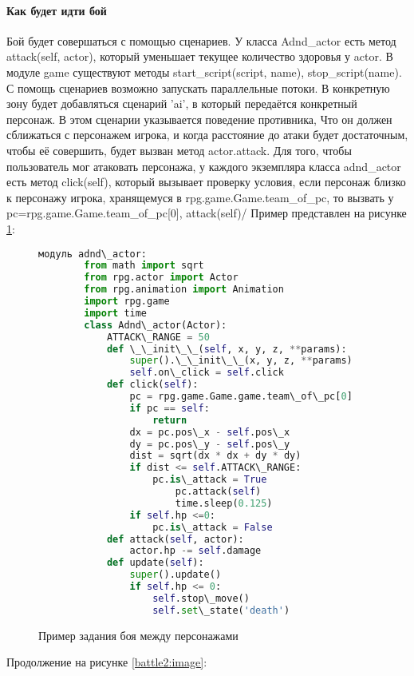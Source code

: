 \paragraph{Как будет идти бой}
Бой будет совершаться с помощью сценариев. У класса Adnd\_actor есть метод attack(self, actor), который уменьшает текущее количество здоровья у actor. В модуле game существуют методы start\_script(script, name), stop\_script(name). С помощь сценариев возможно запускать параллельные потоки. В конкретную зону будет добавляться сценарий 'ai', в который передаётся конкретный персонаж. В этом сценарии указывается поведение противника, Что он должен сближаться с персонажем игрока, и когда расстояние до атаки будет достаточным, чтобы её совершить, будет вызван метод actor.attack. Для того, чтобы пользователь мог атаковать персонажа, у каждого экземпляра класса adnd\_actor есть метод click(self), который вызывает проверку условия, если персонаж близко к персонажу игрока, хранящемуся в rpg.game.Game.team\_of\_pc, то вызвать у pc=rpg.game.Game.team\_of\_pc[0], attack(self)/
Пример представлен на рисунке \ref{battle:image}:
\begin{figure}[H]
	\begin{lstlisting}[language=Python]
		модуль adnd\_actor:
		from math import sqrt
		from rpg.actor import Actor
		from rpg.animation import Animation
		import rpg.game
		import time
		class Adnd\_actor(Actor):	
			ATTACK\_RANGE = 50
			def \_\_init\_\_(self, x, y, z, **params):
				super().\_\_init\_\_(x, y, z, **params)
				self.on\_click = self.click
			def click(self):
				pc = rpg.game.Game.game.team\_of\_pc[0]
				if pc == self:
					return
				dx = pc.pos\_x - self.pos\_x
				dy = pc.pos\_y - self.pos\_y
				dist = sqrt(dx * dx + dy * dy)
				if dist <= self.ATTACK\_RANGE:
					pc.is\_attack = True
						pc.attack(self)
						time.sleep(0.125)
				if self.hp <=0:
					pc.is\_attack = False
			def attack(self, actor):
				actor.hp -= self.damage
			def update(self):
				super().update()
				if self.hp <= 0:
					self.stop\_move()
					self.set\_state('death')
\end{lstlisting}  
\caption{Пример задания боя между персонажами}
\label{battle:image}
\end{figure}
Продолжение на рисунке \ref{battle2:image}:
